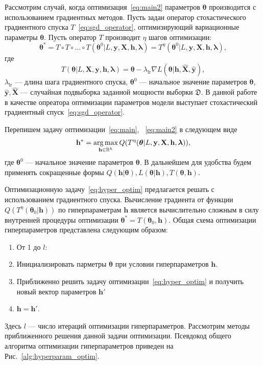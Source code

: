 Рассмотрим случай, когда оптимизация~\eqref{eq:main2} параметров $\boldsymbol{\theta}$ производится с использованием градиентных методов.  Пусть задан оператор стохастического градиентного спуска $T$~\eqref{eq:sgd_operator}, оптимизирующий вариационные параметры $\boldsymbol{\theta}$.
Пусть оператор $T$ производит $\eta$ шагов оптимизации:
\begin{equation}
\label{eq:gd}
	 \boldsymbol{\theta}^{*} = T \circ T \circ \dots \circ T(\boldsymbol{\theta}^{0} | L, \mathbf{y}, \mathbf{X}, \mathbf{h}, \boldsymbol{\lambda}) = T^\eta(\boldsymbol{\theta}^{0} | L, \mathbf{y}, \mathbf{X}, \mathbf{h}, \boldsymbol{\lambda}),
\end{equation}
где 
$$
	T( \boldsymbol{\theta}| L,\mathbf{X},  \mathbf{y},  \mathbf{h}, \boldsymbol{\lambda}) = \boldsymbol{\theta} - \lambda_{\text{lr}} \nabla L(\boldsymbol{\theta}|   \mathbf{h},  \hat{\mathbf{X}}, \hat{\mathbf{y}}), 
$$
$ \lambda_{\text{lr}}$ --- длина шага градиентного спуска, $\boldsymbol{\theta}^0$ --- начальное значение параметров $\boldsymbol{\theta}$, $\hat{\mathbf{y}}, \hat{\mathbf{X}}$ --- случайная подвыборка заданной мощности выборки $\mathfrak{D}$. В данной работе в качестве опреатора оптимизации параметров модели выступает стохастический градиентный спуск~\eqref{eq:sgd_operator}.

Перепишем задачу оптимизации~\eqref{eq:main}, ~\eqref{eq:main2} в следующем виде
\begin{equation}
\label{eq:hyper_optim}
    \mathbf{h}^{*} = \operatorname*{arg\,max}_{\mathbf{h} \in \mathbb{R}^h} Q(T^\eta(\boldsymbol{\theta} | L, \mathbf{y}, \mathbf{X}, \mathbf{h}, \boldsymbol{\lambda})),
\end{equation}
где $\boldsymbol{\theta}^0$ --- начальное значение параметров $\boldsymbol{\theta}$.
В дальнейшем для удобства будем применять сокращенные формы $Q(\mathbf{h}| \boldsymbol{\theta}), L(\boldsymbol{\theta}| \mathbf{h}), T(\boldsymbol{\theta}, \mathbf{h}).$

Оптимизационную задачу~\eqref{eq:hyper_optim} предлагается решать с использованием градиентного спуска. Вычисление градиента от функции $Q( T^\eta(\boldsymbol{\theta}_0| \mathbf{h}))$ по гиперпараметрам $\mathbf{h}$ является вычислительно сложным в силу внутренней процедуры оптимизации $\boldsymbol{\theta}^{*} = T(\boldsymbol{\theta}_0, \mathbf{h})$. 
Общая схема  оптимизации гиперпараметров представлена следующим образом:
\begin{enumerate}
\item От 1 до  $l$:
\item Инициализировать парметры $\boldsymbol{\theta}$ при условии гиперпараметров $\mathbf{h}$.
\item Приближенно решить задачу оптимизации~\eqref{eq:hyper_optim} и получить новый вектор параметров $\mathbf{h}'$
\item $\mathbf{h} = \mathbf{h}'$.
\end{enumerate}
Здесь $l$ --- число итераций оптимизации гиперпараметров. Рассмотрим методы приближенного решения данной задачи оптимизации.
Псевдокод общего алгоритма оптимизации гиперпараметров приведен на Рис.~\ref{alg:hyperparam_optim}.


